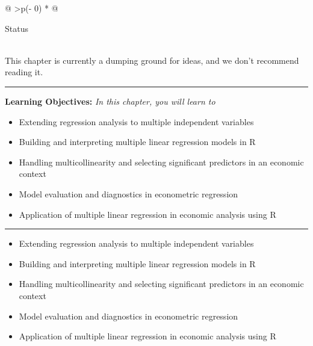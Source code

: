 \documentclass[
  letterpaper,
  paper =a4,
  twoside,
  openright,
  headsepline,
  footsepline,
  listof = totocnumbered,
  chapterprefix = true,
  firstiscover]{scrbook}
\providecommand{\abstractname}{Learning Objectives} %
\newenvironment{objectives}[1]{%
	\hrule
	\vspace{5pt}
	\small\textbf{\abstractname: } 
	\newline
	\vspace{0.1cm}
	\small\emph{#1} %
	\itshape %
}{%
	\vspace{5pt}
	\hrule
	\vspace{0.6cm}
}
\begin{document}
\begin{longtable}[]{@{}
  >{\centering\arraybackslash}p{(\columnwidth - 0\tabcolsep) * }@{}}
\toprule\noalign{}
\begin{minipage}[b]{\linewidth}\centering
Status
\end{minipage} \\
\midrule\noalign{}
\endhead
\bottomrule\noalign{}
\endlastfoot
This chapter is currently a dumping ground for ideas, and we don't
recommend reading it. \\
\end{longtable}

\begin{objectives}{In this chapter, you will learn to}
\begin{itemize}

\item{Extending regression analysis to multiple independent variables}

\item{Building and interpreting multiple linear regression models in R}

\item{Handling multicollinearity and selecting significant predictors in an economic context}

\item{Model evaluation and diagnostics in econometric regression}

\item{Application of multiple linear regression in economic analysis using R}

\end{itemize}

\end{objectives}

\begin{itemize}
\item
  Extending regression analysis to multiple independent variables
\item
  Building and interpreting multiple linear regression models in R
\item
  Handling multicollinearity and selecting significant predictors in an
  economic context
\item
  Model evaluation and diagnostics in econometric regression
\item
  Application of multiple linear regression in economic analysis using R
\end{itemize}

\end{document}
